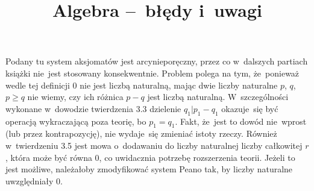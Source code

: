 \documentclass[a4paper,11pt]{article}
\title{Algebra --~błędy i~uwagi}
\begin{document}



\maketitle  %









\start {} Podany tu system aksjomatów jest arcynieporęczny,
przez co w~dalszych partiach książki nie~jest stosowany konsekwentnie.
Problem polega na tym, że~ponieważ wedle tej definicji 0 nie jest
liczbą naturalną, mając dwie liczby naturalne $p$, $q$, $p \geq q$ nie
wiemy, czy ich różnica $p - q$ jest liczbą naturalną. W~szczególności
wykonane w~dowodzie twierdzenia 3.3 dzielenie
$q_{ 1 } | p_{ 1 } - q_{ 1 }$ okazuje~się być operacją wykraczającą
poza teorię, bo $p_{ 1 } = q_{ 1 }$. Fakt, że~jest to dowód nie~wprost
(lub przez kontrapozycję), nie wydaje~się zmieniać istoty rzeczy.
Również w~twierdzeniu 3.5 jest mowa o~dodawaniu do liczby naturalnej
liczby całkowitej $r$, która może być równa 0, co uwidacznia potrzebę
rozszerzenia teorii. Jeżeli to jest możliwe, należałoby zmodyfikować
system Peano tak, by liczby naturalne uwzględniały 0.
\end{document}
